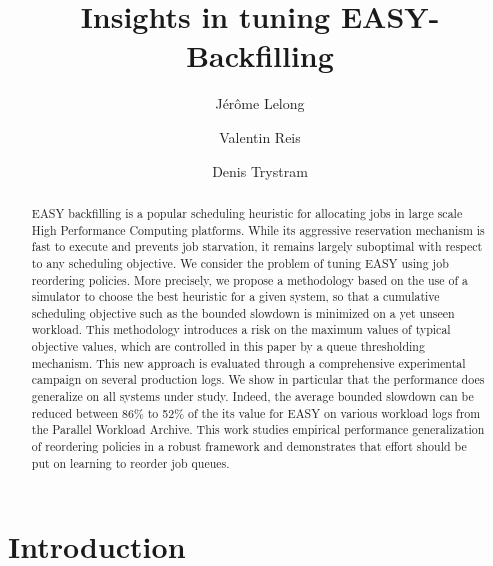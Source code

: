 \newcommand{\ra}[1]{\renewcommand{\arraystretch}{#1}}

\title{Insights in tuning EASY-Backfilling}

\author{
}

\author{J\'er\^ome Lelong \and Valentin Reis \and Denis Trystram}


\maketitle

\begin{abstract}

  EASY backfilling is a popular scheduling heuristic for allocating jobs in
  large scale High Performance Computing platforms. While its aggressive
  reservation mechanism is fast to execute and prevents job starvation, it
  remains largely suboptimal with respect to any scheduling objective. We
  consider the problem of tuning EASY using job reordering policies. More
  precisely, we propose a methodology based on the use of a simulator to choose
  the best heuristic for a given system, so that a cumulative scheduling
  objective such as the bounded slowdown is minimized on a yet unseen workload.
  This methodology introduces a risk on the maximum values of typical objective
  values, which are controlled in this paper by a queue thresholding mechanism.
  This new approach is evaluated through a comprehensive experimental campaign
  on several production logs. We show in particular that the performance does
  generalize on all systems under study. Indeed, the average bounded slowdown
  can be reduced between 86\% to 52\% of the its value for EASY on various
  workload logs from the Parallel Workload Archive.  This work studies
  empirical performance generalization of reordering policies in a robust
  framework and demonstrates that effort should be put on learning to reorder
  job queues.

\end{abstract}

\section{Introduction}

